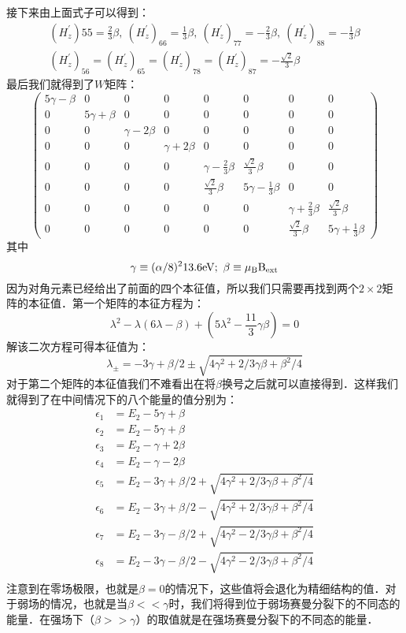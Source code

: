 接下来由上面式子可以得到：
\begin{align}
(H_z^{'}){55}=\frac{2}{3}\beta,\ (H_z^{'})_{66}=\frac{1}{3}\beta,\ (H_z^{'})_{77}=-\frac{2}{3}\beta,\ (H_z^{'})_{88}=-\frac{1}{3}\beta\\
(H_z^{'})_{56}=(H_z^{'})_{65}=(H_z^{'})_{78}=(H_z^{'})_{87}=-\frac{\sqrt{2}}{3}\beta
\end{align}
最后我们就得到了$W$矩阵：
\begin{equation}
\begin{pmatrix}
5\gamma -\beta & 0 & 0 & 0 & 0 & 0 & 0 & 0\\
 0 & 5\gamma +\beta  & 0 & 0 & 0 & 0 & 0 & 0\\
 0 & 0 & \gamma-2\beta & 0 & 0 & 0 & 0 & 0\\
 0 & 0 & 0 & \gamma+2\beta & 0 & 0 & 0 & 0\\
 0 & 0 & 0 & 0 & \gamma-\frac{2}{3}\beta & \frac{\sqrt{2}}{3}\beta& 0 & 0\\
 0 & 0 & 0 & 0 & \frac{\sqrt{2}}{3}\beta & 5\gamma -\frac{1}{3}\beta & 0 & 0\\
 0 & 0 & 0 & 0 & 0 & 0 & \gamma+\frac{2}{3}\beta &\frac{\sqrt{2}}{3}\beta \\
 0 & 0 & 0 & 0 & 0 & 0 & \frac{\sqrt{2}}{3}\beta & 5\gamma +\frac{1}{3}\beta
\end{pmatrix}
\end{equation}
其中
\begin{equation}
\gamma\equiv(\alpha/8)^2 13.6\rm{eV}; \ \beta\equiv\mu_B B_{\rm{ext}}
\end{equation}
因为对角元素已经给出了前面的四个本征值，所以我们只需要再找到两个$2\times2$矩阵的本征值．第一个矩阵的本征方程为：
\begin{equation}
\lambda^2-\lambda(6\lambda-\beta)+(5\lambda^2-\frac{11}{3}\gamma\beta)=0
\end{equation}
解该二次方程可得本征值为：
\begin{equation}
\lambda_\pm = -3\gamma +\beta/2\pm \sqrt{4\gamma^2+2/3\gamma\beta+\beta^2/4}
\end{equation}
对于第二个矩阵的本征值我们不难看出在将$\beta$换号之后就可以直接得到．这样我们就得到了在中间情况下的八个能量的值分别为：
\begin{align}
\epsilon_1 &= E_2-5\gamma+\beta\\
\epsilon_2 &= E_2-5\gamma+\beta\\
\epsilon_3 &= E_2-\gamma+2\beta\\
\epsilon_4 &= E_2-\gamma-2\beta\\
\epsilon_5 &= E_2-3\gamma +\beta/2+\sqrt{4\gamma^2+2/3\gamma\beta+\beta^2/4}\\
\epsilon_6 &= E_2-3\gamma +\beta/2-\sqrt{4\gamma^2+2/3\gamma\beta+\beta^2/4}\\
\epsilon_7 &= E_2-3\gamma -\beta/2+\sqrt{4\gamma^2-2/3\gamma\beta+\beta^2/4}\\
\epsilon_8 &= E_2-3\gamma -\beta/2-\sqrt{4\gamma^2-2/3\gamma\beta+\beta^2/4}\\
\end{align}
注意到在零场极限，也就是$\beta=0$的情况下，这些值将会退化为精细结构的值．对于弱场的情况，也就是当$\beta<<\gamma$时，我们将得到位于弱场赛曼分裂下的不同态的能量．在强场下（$\beta>>\gamma$）的取值就是在强场赛曼分裂下的不同态的能量．

